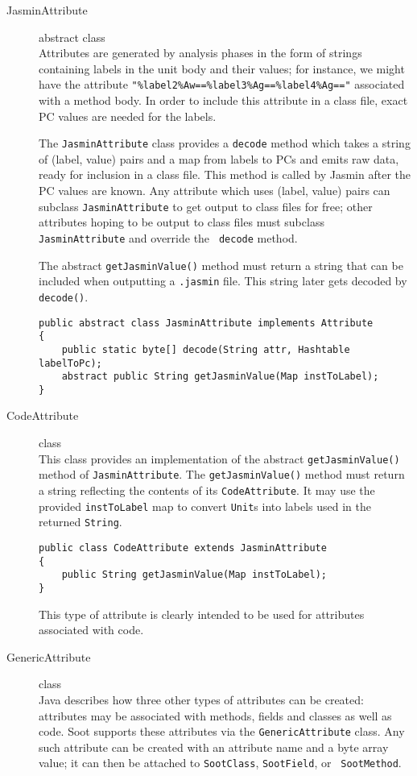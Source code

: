 \documentclass{article}
\begin{document}
\begin{description}
\item[JasminAttribute] abstract class\\
Attributes are generated by analysis phases in the form
of strings containing labels in the unit body and their values;
for instance, we might have the attribute
\verb+"%label2%Aw==%label3%Ag==%label4%Ag=="+ 
associated with a method body.  In order to include this
attribute in a class file, exact PC values are needed for the
labels.  

The {\tt JasminAttribute} class provides a {\tt decode} method which
takes a string of (label, value) pairs and a map from labels to PCs
and emits raw data, ready for inclusion in a class file.  This method
is called by Jasmin after the PC values are known.  Any attribute
which uses (label, value) pairs can subclass {\tt JasminAttribute} to get
output to class files for free; other attributes hoping to be output to
class files must subclass {\tt JasminAttribute} and override the {\tt
decode} method.

The abstract {\tt getJasminValue()} method must return a string that
can be included when outputting a {\tt .jasmin} file.  This string
later gets decoded by {\tt decode()}.
    
\begin{verbatim}
public abstract class JasminAttribute implements Attribute
{
    public static byte[] decode(String attr, Hashtable labelToPc);
    abstract public String getJasminValue(Map instToLabel);
}
\end{verbatim}

\item[CodeAttribute] class\\
This class provides an implementation of the abstract
{\tt getJasminValue()} method of {\tt JasminAttribute}.
The {\tt getJasminValue()} method must return a string reflecting
the contents of its {\tt CodeAttribute}.  It may use the provided
{\tt instToLabel} map to convert {\tt Unit}s into labels used in the
returned {\tt String}.

\begin{verbatim}
public class CodeAttribute extends JasminAttribute
{
    public String getJasminValue(Map instToLabel);
}
\end{verbatim}

This type of attribute is clearly intended to be used for attributes
associated with code.

\item[GenericAttribute] class\\ Java describes how three other types
of attributes can be created: attributes may be associated with
methods, fields and classes as well as code.  Soot supports these
attributes via the {\tt GenericAttribute} class.  Any such attribute
can be created with an attribute name and a byte array value; it can
then be attached to {\tt SootClass}, {\tt SootField}, or {\tt
SootMethod}.


\end{description}
\end{document}
